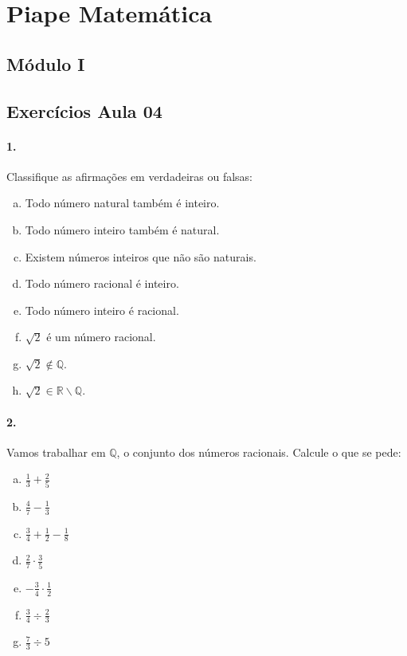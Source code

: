 \documentclass[a4paper,twocolumn,12pt]{article}
\begin{document}
 
\section*{Piape Matemática} 
 
\subsection*{Módulo I}
\subsection*{Exercícios Aula 04}

\paragraph{1.} Classifique as afirmações em verdadeiras ou falsas:
\begin{enumerate}[a)]
\item Todo número natural também é inteiro. 
\item Todo número inteiro também é natural.  
\item Existem números inteiros que não são naturais.
\item Todo número racional é inteiro. 
\item Todo número inteiro é racional.
\item $\sqrt{2}$ é um número racional.
\item $\sqrt{2} \notin \mathbb{Q}$.
\item $\sqrt{2} \in \mathbb{R\backslash Q}$.
\end{enumerate}

\paragraph*{2. } Vamos trabalhar em $\mathbb{Q}$, o conjunto dos números racionais. Calcule o que se pede:

\begin{enumerate}[a)]
  \item $\displaystyle\frac{1}{3} + \frac{2}{5}$
  \item $\displaystyle\frac{4}{7} - \frac{1}{3}$
  \item $\displaystyle\frac{3}{4} + \frac{1}{2} - \frac{1}{8}$
  \item $\displaystyle\frac{2}{7}\cdot \frac{3}{5}$
  \item $\displaystyle-\frac{3}{4} \cdot \frac{1}{2}$
  \item $\displaystyle\frac{3}{4} \div \frac{2}{3}$
  \item $\displaystyle \frac{7}{3} \div 5$
\end{enumerate}
\end{document}
